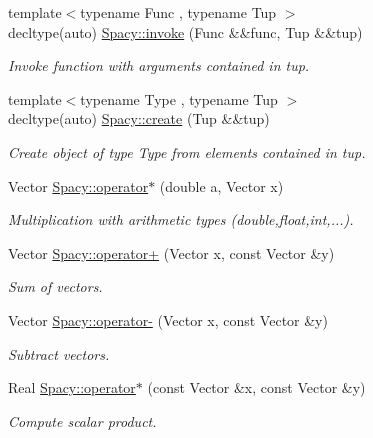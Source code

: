 \begin{DoxyCompactItemize}
{\footnotesize template$<$typename Func , typename Tup $>$ }\\decltype(auto) \hyperlink{group__SpacyGroup_ga64250818ba7ff711c207af6ab40ff986_ga64250818ba7ff711c207af6ab40ff986}{Spacy\+::invoke} (Func \&\&func, Tup \&\&tup)
\begin{DoxyCompactList}\small\item\em Invoke function with arguments contained in tup. \end{DoxyCompactList}\item 
{\footnotesize template$<$typename Type , typename Tup $>$ }\\decltype(auto) \hyperlink{group__SpacyGroup_gae823c82326475d3cc3b166533deddf21_gae823c82326475d3cc3b166533deddf21}{Spacy\+::create} (Tup \&\&tup)
\begin{DoxyCompactList}\small\item\em Create object of type Type from elements contained in tup. \end{DoxyCompactList}\item 
Vector \hyperlink{group__SpacyGroup_ga9471ec2eaf7138385a168f5f7c61b7f4_ga9471ec2eaf7138385a168f5f7c61b7f4}{Spacy\+::operator$\ast$} (double a, Vector x)
\begin{DoxyCompactList}\small\item\em Multiplication with arithmetic types (double,float,int,...). \end{DoxyCompactList}\item 
Vector \hyperlink{group__SpacyGroup_ga19486acb05af1627ec49c376b204a61c_ga19486acb05af1627ec49c376b204a61c}{Spacy\+::operator+} (Vector x, const Vector \&y)
\begin{DoxyCompactList}\small\item\em Sum of vectors. \end{DoxyCompactList}\item 
Vector \hyperlink{group__SpacyGroup_ga9eaf4be1a4e8f3ee03e4c4fdafa5687d_ga9eaf4be1a4e8f3ee03e4c4fdafa5687d}{Spacy\+::operator-\/} (Vector x, const Vector \&y)
\begin{DoxyCompactList}\small\item\em Subtract vectors. \end{DoxyCompactList}\item 
Real \hyperlink{group__SpacyGroup_ga1d84603fc2bfbefca6a020b1217519ad_ga1d84603fc2bfbefca6a020b1217519ad}{Spacy\+::operator$\ast$} (const Vector \&x, const Vector \&y)
\begin{DoxyCompactList}\small\item\em Compute scalar product. \end{DoxyCompactList}\item 

\end{DoxyCompactItemize}
